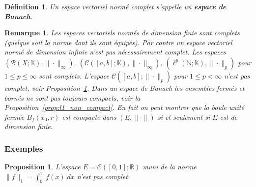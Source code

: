 \documentclass{article}
\newtheorem{proposition}[theorem]{Proposition}
\newtheorem{definition}{Définition}
\newtheorem{remark}{Remarque}
\newcommand{\K}{\mathbb{K}}
\newcommand{\R}{\mathbb{R}}
\newcommand{\N}{\mathbb{N}}
\begin{document}
\begin{definition}
Un espace vectoriel normé complet s'appelle un \textbf{espace de Banach}.
\end{definition}

\begin{remark}
Les espaces vectoriels normés de dimension finie sont complets (quelque soit la norme dont ils sont équipés).
Par contre un espace vectoriel normé de dimension infinie n'est pas nécessairement complet.
Les espaces $(\mathcal{B}(X; \K), \|\cdot\|_\infty)$, $(\mathcal{C}([a, b]; \K), \|\cdot\|_\infty)$, $(\ell^p(\N; \K), \|\cdot\|_p)$ pour $1 \leq p \leq \infty$ sont complets.
L'espace $\mathcal{C}([a, b]; \|\cdot\|_p)$ pour $1 \leq p < \infty$ n'est pas complet, voir Proposition~\ref{prop:C01_non_complet}.
Dans un espace de Banach les ensembles fermés et bornés ne sont pas toujours compacts, voir la Proposition~\ref{prop:l1_non_compact}. En fait on peut montrer que la boule unité fermée $B_f(x_0, r)$ est compacte dans $(E, \|\cdot\|)$ si et seulement si $E$ est de dimension finie.
\end{remark}

\subsubsection{Exemples}

\begin{proposition} \label{prop:C01_non_complet}
L'espace $E = \mathcal{C}([0, 1]; \R)$ muni de la norme $\|f\|_1 = \int_0^1 |f(x)| dx$ n'est pas complet.
\end{proposition}
\end{document}
